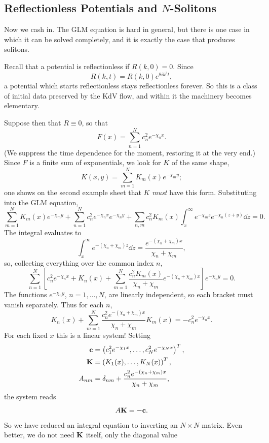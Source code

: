 \documentclass[a4paper]{scrartcl}
\begin{document}
\subsection{Reflectionless Potentials and \texorpdfstring{$N$}{N}-Solitons}

Now we cash in. The GLM equation is hard in general, but there is one case in which it can be solved completely, and it is exactly the case that produces solitons.

Recall that a potential is reflectionless if $R(k,0) = 0$. Since
$$
R(k,t) = R(k,0)e^{8ik^3t},
$$
a potential which starts reflectionless stays reflectionless forever. So this is a class of initial data preserved by the KdV flow, and within it the machinery becomes elementary.

Suppose then that $R \equiv 0$, so that
$$
F(x) = \sum_{n=1}^Nc_n^2e^{-\chi_nx}.
$$
(We suppress the time dependence for the moment, restoring it at the very end.) Since $F$ is a finite sum of exponentials, we look for $K$ of the same shape,
$$
K(x,y) = \sum_{m=1}^NK_m(x)e^{-\chi_my};
$$
one shows on the second example sheet that $K$ \emph{must} have this form. Substituting into the GLM equation,
$$
\sum_{m=1}^NK_m(x)e^{-\chi_my} + \sum_{n=1}^Nc_n^2e^{-\chi_nx}e^{-\chi_ny} + \sum_{n,m}c_n^2K_m(x)\int_x^\infty e^{-\chi_mz}e^{-\chi_n(z+y)}\dd z = 0.
$$
The integral evaluates to
$$
\int_x^\infty e^{-(\chi_n+\chi_m)z}\dd z = \frac{e^{-(\chi_n+\chi_m)x}}{\chi_n+\chi_m},
$$
so, collecting everything over the common index $n$,
\begin{equation*}
\sum_{n=1}^N\left[c_n^2e^{-\chi_nx} + K_n(x) + \sum_{m=1}^N\frac{c_n^2K_m(x)}{\chi_n+\chi_m}e^{-(\chi_n+\chi_m)x}\right]e^{-\chi_ny} = 0.\tag{$*$}
\end{equation*}
The functions $e^{-\chi_ny}$, $n=1,\dots,N$, are linearly independent, so each bracket must vanish separately. Thus for each $n$,
$$
K_n(x) + \sum_{m=1}^N\frac{c_n^2e^{-(\chi_n+\chi_m)x}}{\chi_n+\chi_m}K_m(x) = -c_n^2e^{-\chi_nx}.
$$
For each fixed $x$ this is a linear system! Setting
\begin{align*}
	\mathbf{c} &= \left(c_1^2e^{-\chi_1x}, \dots, c_N^2e^{-\chi_Nx}\right)^T,\\
	\mathbf{K} &= \left(K_1(x),\dots,K_N(x)\right)^T,\\
	A_{nm} &= \delta_{nm} + \frac{c_n^2e^{-(\chi_n+\chi_m)x}}{\chi_n+\chi_m},
\end{align*}
the system reads
$$
A\mathbf{K} = -\mathbf{c}.
$$
So we have reduced an integral equation to inverting an $N\times N$ matrix. Even better, we do not need $\mathbf{K}$ itself, only the diagonal value
\end{document}

